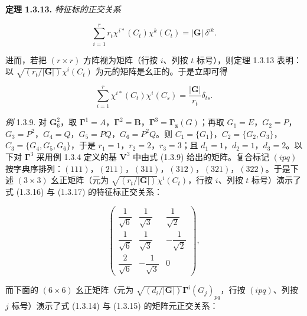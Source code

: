 \textbf{定理 1.3.13.} \textit{特征标的正交关系}

\begin{equation*}
\sum_{i=1}^{r} r_{t}\chi^{i*}(C_{t})\chi^{k}(C_{t}) = |\mathbf{G}|\ \delta^{ik}.
\tag{1.3.16}
\end{equation*}

进而，若把 $(r \times r)$ 方阵视为矩阵（行按 $i$、列按 $t$ 标号），则定理 1.3.13 表明：以 $\sqrt{(r_{t}/|\mathbf{G}|)}\chi^{i}(C_{t})$ 为元的矩阵是幺正的。于是立即可得

\begin{equation*}
\sum_{i=1}^{r} \chi^{i*}(C_{t})\chi^{i}(C_{s}) = \frac{|\mathbf{G}|}{r_{t}}\delta_{ts}.
\tag{1.3.17}
\end{equation*}

\textit{例} 1.3.9. 对 $\mathbf{G}_6^2$，取 $\mathbf{\Gamma}^{1} = A$，$\mathbf{\Gamma}^{2} = \mathbf{B}$，$\mathbf{\Gamma}^{3} = \mathbf{\Gamma}_{\mathbf{z}}(G)$；再取 $G_{1} = E$，$G_{2} = P$，$G_{3} = P^{2}$，$G_{4} = Q$，$G_{5} = PQ$，$G_{6} = P^{2}Q$。则 $C_{1} = \{G_{1}\}$，$C_{2} = \{G_{2}, G_{3}\}$，$C_{3} = \{G_{4}, G_{5}, G_{6}\}$，于是 $r_{1} = 1$，$r_{2} = 2$，$r_{3} = 3$；且 $d_{1} = 1$，$d_{2} = 1$，$d_{3} = 2$。以下对 $\mathbf{\Gamma}^{3}$ 采用例 1.3.4 定义的基 $\mathbf{V}^{3}$ 中由式 (1.3.9) 给出的矩阵。复合标记 $(ipq)$ 按字典序排列：$(111)$，$(211)$，$(311)$，$(312)$，$(321)$，$(322)$。于是下述 $(3 \times 3)$ 幺正矩阵（元为 $\sqrt{(r_{t}/|\mathbf{G}|)}\chi^{i}(C_{t})$，行按 $i$、列按 $t$ 标号）演示了式 (1.3.16) 与 (1.3.17) 的特征标正交关系：

\begin{equation*}
\begin{pmatrix} \dfrac{1}{\sqrt{6}} & \dfrac{1}{\sqrt{3}} & \dfrac{1}{\sqrt{2}} \\[2mm] \dfrac{1}{\sqrt{6}} & \dfrac{1}{\sqrt{3}} & -\dfrac{1}{\sqrt{2}} \\[2mm] \dfrac{2}{\sqrt{6}} & -\dfrac{1}{\sqrt{3}} & 0 \end{pmatrix},
\end{equation*}

而下面的 $(6 \times 6)$ 幺正矩阵（元为 $\sqrt{(d_{i}/|\mathbf{G}|)}\mathbf{\Gamma}^{i}(G_{j})_{pq}$，行按 $(ipq)$、列按 $j$ 标号）演示了式 (1.3.14) 与 (1.3.15) 的矩阵元正交关系：

